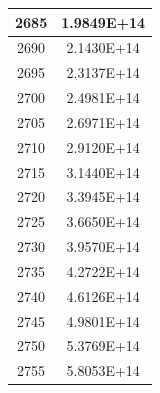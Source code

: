 \documentclass[a4paper]{article}
\begin{document}
\begin{tabular}{| c | c |}
    	2685 & 1.9849E+14 \\\hline
    	2690 & 2.1430E+14 \\\hline
    	2695 & 2.3137E+14 \\\hline
    	2700 & 2.4981E+14 \\\hline
    	2705 & 2.6971E+14 \\\hline
    	2710 & 2.9120E+14 \\\hline
    	2715 & 3.1440E+14 \\\hline
    	2720 & 3.3945E+14 \\\hline
    	2725 & 3.6650E+14 \\\hline
    	2730 & 3.9570E+14 \\\hline
    	2735 & 4.2722E+14 \\\hline
    	2740 & 4.6126E+14 \\\hline
    	2745 & 4.9801E+14 \\\hline
    	2750 & 5.3769E+14 \\\hline
    	2755 & 5.8053E+14 \\\hline
    \end{tabular}
    \hfill
\end{document}
